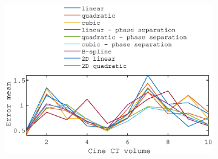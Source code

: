 \documentclass[11pt,a4paper,oneside]{report}
\begin{document}
\begin{figure}[H]
\begin{subfigure}[b]{0.33\textwidth}
    \includegraphics[width=\textwidth, trim=80 163 80 98,clip=true]{figures/task4/def_mean_error_couch1.eps}
  \end{subfigure}%
  

\end{figure}
\end{document}
